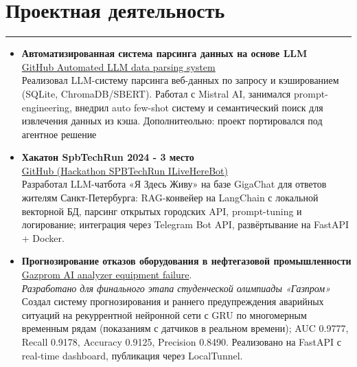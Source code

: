 \documentclass[a4paper,14pt]{article}
\begin{document}
\section*{Проектная деятельность}
\hrule
\vspace{0.5em}
\begin{itemize}


\item \textbf{Автоматизированная система парсинга данных на основе LLM}\\ \href{https://github.com/Denigmma/Automated_LLM_data_parsing_system}{GitHub Automated LLM data parsing system}\\
Реализовал LLM-систему парсинга веб-данных по запросу и кэшированием (SQLite, ChromaDB/SBERT). Работал с Mistral AI, занимался prompt-engineering, внедрил auto few-shot систему и семантический поиск для извлечения данных из кэша. Дополнитеольно: проект портировался под агентное решение


\item \textbf{Хакатон SpbTechRun 2024 - 3 место} \\ \href{https://github.com/Denigmma/Hackathon_SPBTechRun_ILiveHereBot}{GitHub (Hackathon SPBTechRun ILiveHereBot)} \\
Разработал LLM-чатбота «Я Здесь Живу» на базе GigaChat для ответов жителям Санкт-Петербурга: RAG-конвейер на LangChain с локальной векторной БД, парсинг открытых городских API, prompt-tuning и логирование; интеграция через Telegram Bot API, развёртывание на FastAPI + Docker.


\item \textbf{Прогнозирование отказов оборудования в нефтегазовой промышленности} \\
\href{https://github.com/Denigmma/Gazprom_AI_analyzer_equipment_failure}{Gazprom AI analyzer equipment failure}.\\
\textit{Разработано для финального этапа студенческой олимпиады «Газпром»}\\
Создал систему прогнозирования и раннего предупреждения аварийных ситуаций на рекуррентной нейронной сети с GRU по многомерным временным рядам (показаниям с датчиков в реальном времени); AUC 0.9777, Recall 0.9178, Accuracy 0.9125, Precision 0.8490.
Реализовано на FastAPI с real-time dashboard, публикация через LocalTunnel.



\end{itemize}
\end{document}
